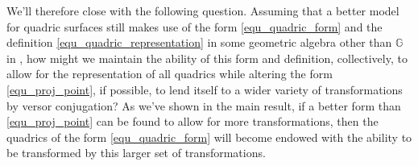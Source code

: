 \documentclass{birkjour}
\theoremstyle{definition}
\theoremstyle{remark}
\numberwithin{equation}{section}
\newcommand{\G}{\mathbb{G}}
\begin{document}
We'll therefore close with the following question.
Assuming that a better model for quadric surfaces still makes use of the form \eqref{equ_quadric_form} and
the definition \eqref{equ_quadric_representation} in some geometric algebra other than $\G$
in \cite{Parkin12}, how might we maintain the ability of this form and definition, collectively,
to allow for the representation of all quadrics while altering the form \eqref{equ_proj_point},
if possible, to lend itself to a wider variety of transformations by versor conjugation?  As we've
shown in the main result, if a better form than \eqref{equ_proj_point} can be found to
allow for more transformations, then
the quadrics of the form \eqref{equ_quadric_form} will become endowed with the ability
to be transformed by this larger set of transformations.
\pagebreak



\end{document}
